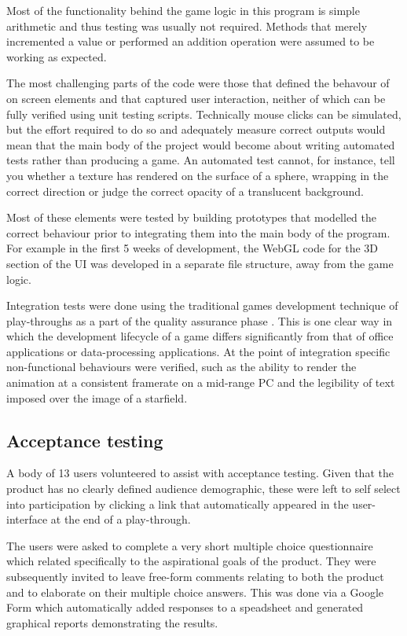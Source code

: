 \documentclass[twoside]{bhamthesis}
\begin{document}
Most of the functionality behind the game logic in this program is simple arithmetic and thus testing was usually not required. Methods that merely incremented a value or performed an addition operation were assumed to be working as expected.

The most challenging parts of the code were those that defined the behavour of on screen elements and that captured user interaction, neither of which can be fully verified using unit testing scripts. Technically mouse clicks can be simulated, but the effort required to do so and adequately measure correct outputs would mean that the main body of the project would become about writing automated tests rather than producing a game. An automated test cannot, for instance, tell you whether a texture has rendered on the surface of a sphere, wrapping in the correct direction or judge the correct opacity of a translucent background.

Most of these elements were tested by building prototypes that modelled the correct behaviour prior to integrating them into the main body of the program. For example in the first 5 weeks of development, the WebGL code for the 3D section of the UI was developed in a separate file structure, away from the game logic.

Integration tests were done using the traditional games development technique of play-throughs as a part of the quality assurance phase \cite{chandler_game_2009}. This is one clear way in which the development lifecycle of a game differs significantly from that of office applications or data-processing applications. At the point of integration specific non-functional behaviours were verified, such as the ability to render the animation at a consistent framerate on a mid-range PC and the legibility of text imposed over the image of a starfield.

\subsection{Acceptance testing}

A body of 13 users volunteered to assist with acceptance testing. Given that the product has no clearly defined audience demographic, these were left to self select into participation by clicking a link that automatically appeared in the user-interface at the end of a play-through.

The users were asked to complete a very short multiple choice questionnaire which related specifically to the aspirational goals of the product. They were subsequently invited to leave free-form comments relating to both the product and to elaborate on their multiple choice answers. This was done via a Google Form which automatically added responses to a speadsheet and generated graphical reports demonstrating the results.
\end{document}

